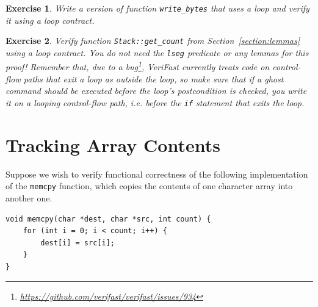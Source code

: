 \documentclass{article}
\newtheorem{exercise}{Exercise}
\begin{document}
\begin{exercise}\label{exercise:tuerk}
Write a version of function \lstinline!write_bytes! that uses a loop and verify it using a loop contract.
\end{exercise}

\begin{exercise}\label{exercise:stack_tuerk}
Verify function \lstinline!Stack::get_count! from Section~\ref{section:lemmas} using a loop contract. You do not need
the \lstinline!lseg! predicate or any lemmas for this proof! Remember that, due to a bug\footnote{\url{https://github.com/verifast/verifast/issues/934}}, VeriFast currently treats code on control-flow paths that exit a loop as outside the loop, so make sure that if a ghost command should be executed before the loop's postcondition is checked, you write it on a looping control-flow path, i.e. \emph{before} the \lstinline|if| statement that exits the loop.
\end{exercise}

\section{Tracking Array Contents}\label{section:memcpy}

Suppose we wish to verify functional correctness of the
following implementation of the \lstinline|memcpy| function,
which copies the contents of one character array into another
one.

\begin{lstlisting}
void memcpy(char *dest, char *src, int count) {
    for (int i = 0; i < count; i++) {
        dest[i] = src[i];
    }
}
\end{lstlisting}
\end{document}

